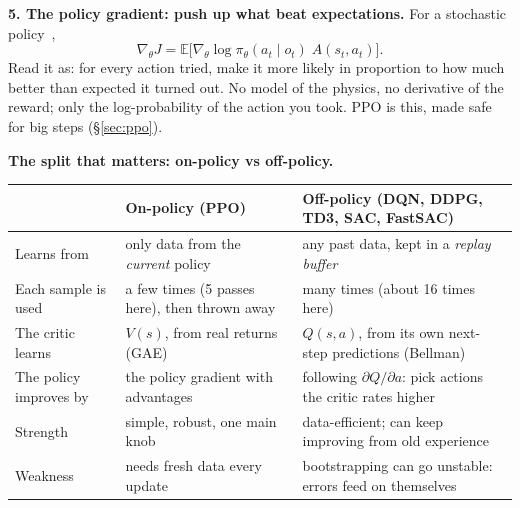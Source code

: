 \documentclass[10pt,letterpaper]{article}
\begin{document}
\textbf{5. The policy gradient: push up what beat expectations.} For a stochastic policy~\cite{williams1992,schulman2016},
\[
\nabla_\theta J=\mathbb{E}\big[\nabla_\theta\log\pi_\theta(a_t\mid o_t)\;A(s_t,a_t)\big].
\]
Read it as: for every action tried, make it more likely in proportion to how much better than expected it turned out. No model
of the physics, no derivative of the reward; only the log-probability of the action you took. PPO is this, made safe for big
steps (§\ref{sec:ppo}).

\textbf{The split that matters: on-policy vs off-policy.}

\begin{small}
\begin{tabularx}{\linewidth}{@{}p{2.6cm}XX@{}}
\toprule
& \textbf{On-policy} (PPO) & \textbf{Off-policy} (DQN, DDPG, TD3, SAC, FastSAC) \\ \midrule
Learns from & only data from the \emph{current} policy & any past data, kept in a \emph{replay buffer} \\
Each sample is used & a few times (5 passes here), then thrown away & many times (about 16 times here) \\
The critic learns & $V(s)$, from real returns (GAE) & $Q(s,a)$, from its own next-step predictions (Bellman) \\
The policy improves by & the policy gradient with advantages & following $\partial Q/\partial a$: pick actions the critic rates higher \\
Strength & simple, robust, one main knob & data-efficient; can keep improving from old experience \\
Weakness & needs fresh data every update & bootstrapping can go unstable: errors feed on themselves \\ \bottomrule
\end{tabularx}
\end{small}
\end{document}
